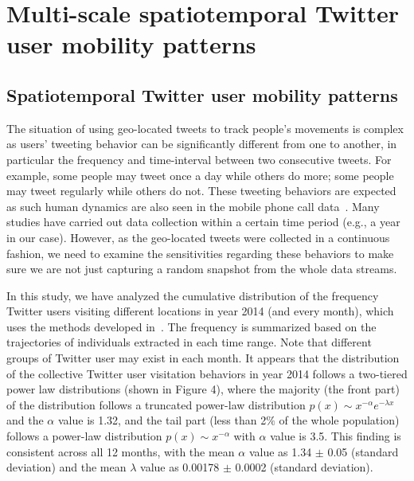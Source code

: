 \documentclass[a4paper, 11pt]{article}
\begin{document}
\section{Multi-scale spatiotemporal Twitter user mobility patterns}
\subsection{Spatiotemporal Twitter user mobility patterns}
The situation of using geo-located tweets to track people's movements is complex as users' tweeting behavior can be significantly different from one to another, in particular the frequency and time-interval between two consecutive tweets. For example, some people may tweet once a day while others do more; some people may tweet regularly while others do not.  
These tweeting behaviors are expected as such human dynamics are also seen in the mobile phone call data~\citep{gonzalez2008understanding}. 
Many studies have carried out data collection within a certain time period (e.g., a year in our case).
However, as the geo-located tweets were collected in a continuous fashion, we need to examine the sensitivities regarding these behaviors to make sure we are not just capturing a random snapshot from the whole data streams. 

In this study, we have analyzed the cumulative distribution of the frequency Twitter users visiting different locations in year 2014 (and every month), which uses the methods developed in~\citep{clauset2009power}. 
The frequency is summarized based on the trajectories of individuals extracted in each time range. Note that different groups of Twitter user may exist in each month. 
It appears that the distribution of the collective Twitter user visitation behaviors in year 2014 follows a two-tiered power law distributions (shown in Figure 4), where the majority (the front part) of the distribution follows a truncated power-law distribution $p(x)\sim x^{-\alpha}e^{-\lambda x}$ and the $\alpha$ value is 1.32, and the tail part (less than 2$\%$ of the whole population) follows a power-law distribution  $p(x)\sim x^{-\alpha}$ with $\alpha$ value is 3.5.
This finding is consistent across all 12 months, with the mean $\alpha$ value as 1.34 $ \pm$  0.05 (standard deviation) and the mean $\lambda$ value as 0.00178 $ \pm$  0.0002 (standard deviation). 
\end{document}
